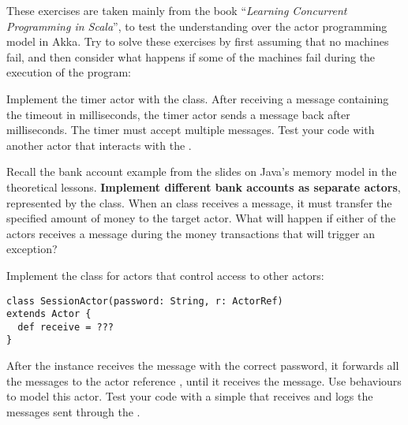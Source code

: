 \documentclass[11pt]{article}
\begin{document}
\myHeader

These exercises are taken mainly from the book ``\emph{Learning Concurrent Programming in Scala}'', to test the understanding over the actor programming model in Akka.
Try to solve these exercises by first assuming that no machines fail, and then consider what happens if some of the machines fail during the execution of the program:

\begin{myExercise}
Implement the timer actor with the  class. After receiving a  message containing the  timeout in milliseconds, the timer actor sends a  message back after  milliseconds. The timer must accept multiple  messages. Test your code with another actor  that interacts with the .
\end{myExercise}

\begin{myExercise}
Recall the bank account example from the slides on Java's memory model in the theoretical lessons. \textbf{Implement different bank accounts as separate actors}, represented by the  class. When an  class receives a  message, it must transfer the specified amount of money to the target actor. What will happen if either of the actors receives a message during the money transactions that will trigger an exception?

\end{myExercise}

\begin{myExercise}
Implement the  class for actors that control access to other actors:
\begin{lstlisting}
class SessionActor(password: String, r: ActorRef)
extends Actor {
  def receive = ???
}
\end{lstlisting}
After the  instance receives the  message with the correct password, it forwards all the messages to the actor reference , until it receives the  message. Use behaviours to model this actor. Test your code with a simple  that receives and logs the messages sent through the .
\end{myExercise}
\end{document}
